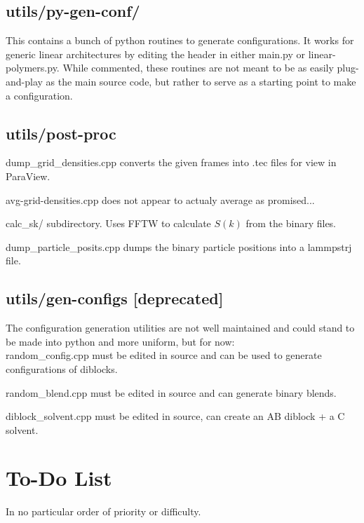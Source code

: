 \documentclass[12pt]{article}
\begin{document}
\subsection{utils/py-gen-conf/}
This contains a bunch of python routines to generate configurations. It works for generic linear architectures by editing the header in either main.py or linear-polymers.py.
While commented, these routines are not meant to be as easily plug-and-play as the main source code, but rather to serve as a starting point to make a configuration.



\subsection{utils/post-proc}
dump\_grid\_densities.cpp converts the given frames into .tec files for view in ParaView.

avg-grid-densities.cpp does not appear to actualy average as promised...

calc\_sk/ subdirectory. Uses FFTW to calculate $S(k)$ from the binary files.

dump\_particle\_posits.cpp dumps the binary particle positions into a lammpstrj file.


\subsection{utils/gen-configs [deprecated]}
The configuration generation utilities are not well maintained and could stand to be made into python and more uniform, but for now:
\\
random\_config.cpp must be edited in source and can be used to generate configurations of diblocks.

random\_blend.cpp must be edited in source and can generate binary blends.

diblock\_solvent.cpp must be edited in source, can create an AB diblock + a C solvent. 







\pagebreak
\section{To-Do List}
In no particular order of priority or difficulty.
\end{document}
